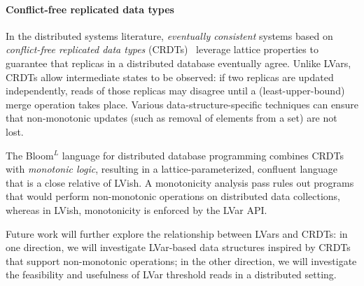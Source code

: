 
\paragraph{Conflict-free replicated data types}

In the distributed systems literature, \emph{eventually consistent}
systems based on \emph{conflict-free replicated data types}
(CRDTs)~\cite{crdts} leverage lattice properties to guarantee that
replicas in a distributed database eventually agree.  Unlike LVars,
CRDTs allow intermediate states to be observed: if two replicas are
updated independently, reads of those replicas may disagree until a
(least-upper-bound) merge operation takes place.  Various
data-structure-specific techniques can ensure that non-monotonic
updates (such as removal of elements from a set) are not lost.

The Bloom$^L$ language for distributed database programming
\cite{blooml} combines CRDTs with \emph{monotonic logic}, resulting in a
lattice-parameterized, confluent language that is a close relative of
LVish.  A monotonicity analysis pass rules out programs
that would perform non-monotonic operations on distributed data
collections, whereas in LVish, monotonicity is enforced by the LVar
API.

Future work will further explore the relationship between LVars and
CRDTs: in one direction, we will investigate LVar-based data
structures inspired by CRDTs that support non-monotonic operations; in
the other direction, we will investigate the feasibility and
usefulness of LVar threshold reads in a distributed setting.
